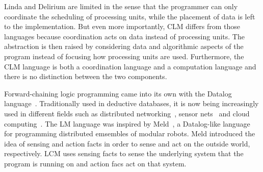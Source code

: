 Linda and Delirium are limited in the sense that the programmer can only
coordinate the scheduling of processing units, while the placement of data is
left to the implementation. But even more importantly, CLM differs from those
languages because coordination acts on data instead of processing units.
The abstraction is then raised by considering data and algorithmic aspects of
the program instead of focusing how processing units are used.
Furthermore, the CLM language is both a coordination language and a computation
language and there is no distinction between the two components.

Forward-chaining logic programming came into its own with the Datalog
language~\cite{Ullman:1990:PDK:533142}.  Traditionally used in deductive
databases, it is now being increasingly used in different fields such as
distributed networking~\cite{Loo-condie-garofalakis-p2}, sensor
nets~\cite{Chu:2007:DID:1322263.1322281} and cloud computing~\cite{alvaro:boom}.
The LM language was inspired by Meld~\cite{ashley-rollman-iclp09}, a Datalog-like language for
programming distributed emsembles of modular robots. Meld introduced the idea of
sensing and action facts in order to sense and act on the outside world,
respectively. LCM uses sensing facts to sense the underlying system that the program is running on and action facs
act on that system.
